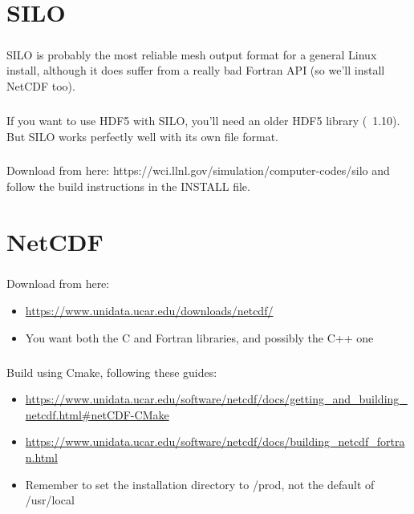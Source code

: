 \documentclass[a4paper,10pt]{report}
\begin{document}
\chapter{SILO}
\paragraph{} SILO is probably the most reliable mesh output format for a general Linux install, although it does suffer from a really bad Fortran API (so we’ll install NetCDF too).
\paragraph{} If you want to use HDF5 with SILO, you’ll need an older HDF5 library (~1.10). But SILO works perfectly well with its own file format.
\paragraph{} Download from here: https://wci.llnl.gov/simulation/computer-codes/silo and follow the build instructions in the INSTALL file.

\chapter{NetCDF}
\paragraph{} Download from here:
\begin{itemize}
    \item \url{https://www.unidata.ucar.edu/downloads/netcdf/}
    \item You want both the C and Fortran libraries, and possibly the C++ one
\end{itemize}
\paragraph{} Build using Cmake, following these guides:
\begin{itemize}
    \item \url{https://www.unidata.ucar.edu/software/netcdf/docs/getting_and_building_netcdf.html#netCDF-CMake}
    \item \url{https://www.unidata.ucar.edu/software/netcdf/docs/building_netcdf_fortran.html}
    \item Remember to set the installation directory to /prod, not the default of /usr/local
\end{itemize}
\end{document}
